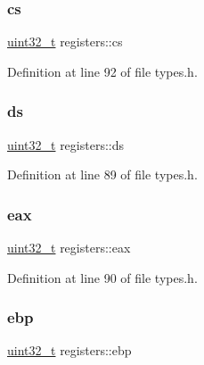 \subsubsection{\texorpdfstring{cs}{cs}}
{\footnotesize\ttfamily \hyperlink{a00134_a435d1572bf3f880d55459d9805097f62_a435d1572bf3f880d55459d9805097f62}{uint32\+\_\+t} registers\+::cs}



Definition at line 92 of file types.\+h.

\mbox{\label{a00252_a806ec3ba0cf965d456601aea4c039ec3_a806ec3ba0cf965d456601aea4c039ec3}} 
\subsubsection{\texorpdfstring{ds}{ds}}
{\footnotesize\ttfamily \hyperlink{a00134_a435d1572bf3f880d55459d9805097f62_a435d1572bf3f880d55459d9805097f62}{uint32\+\_\+t} registers\+::ds}



Definition at line 89 of file types.\+h.

\mbox{\label{a00252_a1e01e806248cd98e55e0b053db6a6a51_a1e01e806248cd98e55e0b053db6a6a51}} 
\subsubsection{\texorpdfstring{eax}{eax}}
{\footnotesize\ttfamily \hyperlink{a00134_a435d1572bf3f880d55459d9805097f62_a435d1572bf3f880d55459d9805097f62}{uint32\+\_\+t} registers\+::eax}



Definition at line 90 of file types.\+h.

\mbox{\label{a00252_a8d156d1d27fcb1c2f2bbcce1a784431f_a8d156d1d27fcb1c2f2bbcce1a784431f}} 
\subsubsection{\texorpdfstring{ebp}{ebp}}
{\footnotesize\ttfamily \hyperlink{a00134_a435d1572bf3f880d55459d9805097f62_a435d1572bf3f880d55459d9805097f62}{uint32\+\_\+t} registers\+::ebp}



